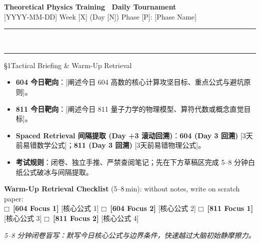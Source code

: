 \documentclass[a4paper,11pt]{article}
\newcommand{\checkbox}{\ensuremath{\mdlgwhtsquare}}
\newcommand{\alerttag}[1]{\textcolor{wine}{\sffamily\bfseries [#1]}}
\begin{document}
\begin{center}
  {\LARGE\bfseries\color{navy} Theoretical Physics Training \textperiodcentered\ Daily Tournament}\\[3pt]
  {\small\sffamily\color{mist} [YYYY-MM-DD] \quad\textbar\quad Week [X] (Day [N]) \quad\textbar\quad Phase [P]: [Phase Name]}\\[-4pt]
  {\color{navy}\rule{\textwidth}{0.8pt}}\\[-11pt]
  {\color{border}\rule{\textwidth}{0.3pt}}
\end{center}

\vspace{-6pt}

\begin{briefing}{\S 1\quad Tactical Briefing \& Warm-Up Retrieval}
\begin{itemize}[leftmargin=1.5em, itemsep=2pt, topsep=1pt]
  \item \textbf{604 今日靶向}：[阐述今日 604 高数的核心计算攻坚目标、重点公式与避坑原则]。
  \item \textbf{811 今日靶向}：[阐述今日 811 量子力学的物理模型、算符代数或概念直觉目标]。
  \item \textbf{Spaced Retrieval 间隔提取 (Day +3 滚动回溯)}：\textbf{604 (Day 3 回溯)} [3天前易错数学公式]；\textbf{811 (Day 3 回溯)} [3天前易错物理公式]。
  \item \textbf{考试规则}：闭卷、独立手推、严禁查阅笔记；先在下方草稿区完成 5--8 分钟白纸公式破冰与间隔提取。
\end{itemize}

\vspace{1mm}
\textbf{Warm-Up Retrieval Checklist} (5--8\,min): without notes, write on scratch paper:\\
\checkbox\ \alerttag{604 Focus 1} [核心公式 1] \quad
\checkbox\ \alerttag{604 Focus 2} [核心公式 2] \quad
\checkbox\ \alerttag{811 Focus 1} [核心公式 3] \quad
\checkbox\ \alerttag{811 Focus 2} [核心公式 4]
\end{briefing}

\vspace{4pt}

\begin{tcolorbox}[
  enhanced, colback=white, colframe=border, boxrule=0.6pt, arc=2mm,
  left=4mm, right=4mm, top=3mm, bottom=3mm,
  fonttitle=\sffamily\bfseries\color{slate},
  title={\raisebox{0pt}{\color{royal}\rule{3pt}{10pt}}\hspace{4pt}Warm-Up Retrieval Workspace \textbar\ 白纸破冰与间隔提取草稿区},
  colbacktitle=paper, coltitle=slate,
  titlerule=0pt, toptitle=2mm, bottomtitle=2mm
]
\textcolor{mist}{\footnotesize\itshape 5--8 分钟闭卷盲写：默写今日核心公式与边界条件，快速越过大脑初始静摩擦力。}
\vspace{9.0cm}
\end{tcolorbox}
\end{document}
